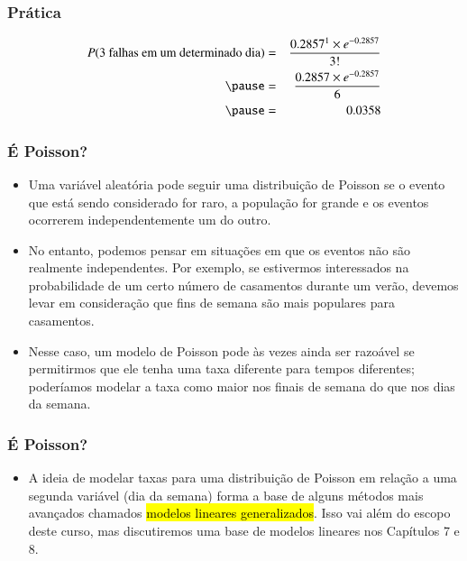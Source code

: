 \begin{frame}
\frametitle{Prática}

\begin{eqnarray*}
P(\text{3 falhas em um determinado dia}) &=& \frac{0.2857^1 \times e^{-0.2857}}{3!} \\
\pause
&=& \frac{0.2857 \times e^{-0.2857}}{6} \\
\pause
&=& 0.0358
\end{eqnarray*}

\end{frame}


\begin{frame}
\frametitle{É Poisson?}

\begin{itemize}
\justifying
\item Uma variável aleatória pode seguir uma distribuição de Poisson se o evento que está sendo considerado for raro, a população for grande e os eventos ocorrerem independentemente um do outro.
\justifying
\item No entanto, podemos pensar em situações em que os eventos não são realmente independentes. Por exemplo, se estivermos interessados na probabilidade de um certo número de casamentos durante um verão, devemos levar em consideração que fins de semana são mais populares para casamentos.
\justifying
\item Nesse caso, um modelo de Poisson pode às vezes ainda ser razoável se permitirmos que ele tenha uma taxa diferente para tempos diferentes; poderíamos modelar a taxa como maior nos finais de semana do que nos dias da semana.
\end{itemize}

\end{frame}

\begin{frame}
\frametitle{É Poisson?}

\begin{itemize}
\justifying
\item A ideia de modelar taxas para uma distribuição de Poisson em relação a uma segunda variável (dia da semana) forma a base de alguns métodos mais avançados chamados \hl{modelos lineares generalizados}. Isso vai além do escopo deste curso, mas discutiremos uma base de modelos lineares nos Capítulos 7 e 8.

\end{itemize}

\end{frame}


